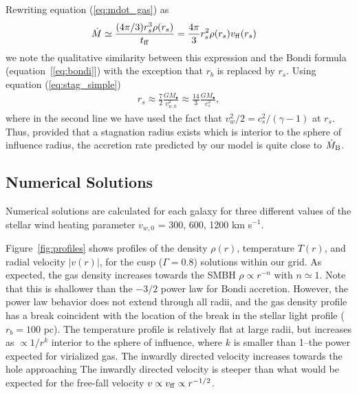 \documentclass[usenatbib,fleqn]{mn2e}
\newcommand{\rs}{r_s}
\newcommand{\rb}{r_b}
\newcommand{\Mbh}[1][]{M_{\bullet#1}}
\newcommand{\vwO}{v_{w,0}}
\newcommand{\tff}{t_{\rm ff}}
\begin{document}
Rewriting equation (\ref{eq:mdot_gas}) as
\begin{align}
  &\dot{M}\simeq\frac{(4 \pi/3) \rs^3 \rho(\rs)}{\tff} =\frac{4
    \pi}{3} \rs^2 \rho(\rs) v_{\rm ff}(\rs)
\end{align}
we note the qualitative similarity between this expression and the Bondi formula (equation~[\ref{eq:bondi}]) with the exception that $\rb$ is replaced by $\rs$.  Using equation (\ref{eq:stag_simple})
\begin{align}
  \rs\approx\frac{7}{2}\frac{G \Mbh}{\vwO^2} \approx \frac{14}{3}\frac{GM_{\bullet}}{c_{s}^{2}},
  \label{eq:rs_simple}
\end{align}
where in the second line we have used the fact that $v_{w}^{2}/2 =
c_s^2/(\gamma-1)$ at $\rs$.  Thus, provided that a stagnation radius
exists which is interior to the sphere of influence radius, the
accretion rate predicted by our model is quite close to $\dot{M}_{\rm
  B}$.



\subsection{Numerical Solutions}

Numerical solutions are calculated for each galaxy for three different values of the stellar wind heating parameter $v_{w,0}$ = 300, 600, 1200 km s$^{-1}$.  

Figure~\ref{fig:profiles} shows profiles of the density $\rho(r)$,
temperature $T(r)$, and radial velocity $|v(r)|$, for the cusp
($\Gamma=0.8$) solutions within our grid.  As expected, the gas
density increases towards the SMBH $\rho\propto r^{-n}$ with
$n\simeq1$.  Note that this is shallower than the $-3/2$ power law for
Bondi accretion. However, the power law behavior does not extend
through all radii, and the gas density profile has a break coincident
with the location of the break in the stellar light profile ($\rb=100$
pc). The temperature profile is relatively flat at large radii, but
increases as $\propto 1/r^{k}$ interior to the sphere of influence,
where $k$ is smaller than 1--the power expected for virialized gas.
The inwardly directed velocity increases towards the hole approaching
The inwardly directed velocity is steeper than what would be expected
for the free-fall velocity $v \propto v_{\rm ff}\propto r^{-1/2}$.
\end{document}
